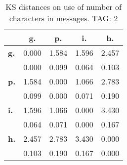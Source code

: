 \begin{table}[h!]
\begin{center}
\begin{tabular}{| l || c | c | c | c |}\hline
 & {\bf g.} & {\bf p.} & {\bf i.} & {\bf h.} \\\hline\hline
{\bf g.} & 0.000 & 1.584 & 1.596 & 2.457 \\
{\bf } & 0.000 & 0.099 & 0.064 & 0.103 \\\hline
{\bf p.} & 1.584 & 0.000 & 1.066 & 2.783 \\
{\bf } & 0.099 & 0.000 & 0.071 & 0.190 \\\hline
{\bf i.} & 1.596 & 1.066 & 0.000 & 3.430 \\
{\bf } & 0.064 & 0.071 & 0.000 & 0.167 \\\hline
{\bf h.} & 2.457 & 2.783 & 3.430 & 0.000 \\
{\bf } & 0.103 & 0.190 & 0.167 & 0.000 \\\hline
\end{tabular}
\caption{KS distances on use of number of characters in messages. TAG: 2}
\end{center}
\end{table}